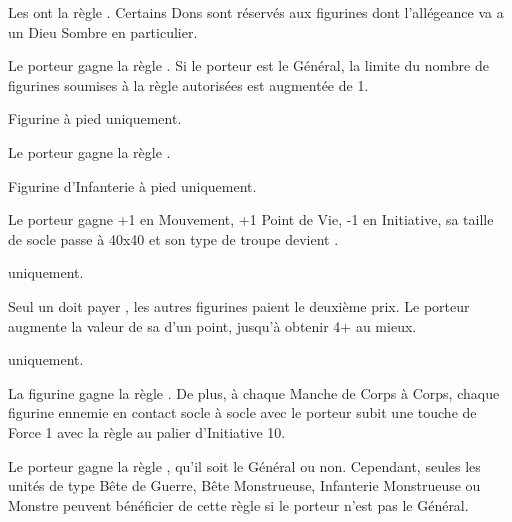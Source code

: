 \enditemlistonecol

\closearmyarmoury












\spaceaftersection{}

Les \giftsofthedarkgods{} ont la règle \oneperarmy{}. Certains Dons sont réservés aux figurines dont l'allégeance va a un Dieu Sombre en particulier.

\begin{multicols}{2}\raggedcolumns

\startpricelistNSP

 Le porteur gagne la règle \terror{}. Si le porteur est le Général, la limite du nombre de figurines soumises à la règle \survivalofthefittest{} autorisées est augmentée de 1.

 Figurine à pied uniquement.

Le porteur gagne la règle .

 Figurine d'Infanterie à pied uniquement.

Le porteur gagne +1 en Mouvement, +1 Point de Vie, -1 en Initiative, sa taille de socle passe à \unit{40x40}{\milli\meter} et son type de troupe devient \monstrousinfantry{}.

\textbf{\dchange} uniquement.

 Seul un \daemonprince{} doit payer , les autres figurines paient le deuxième prix.\newline
Le porteur augmente la valeur de sa \wardsave{} d'un point, jusqu'à obtenir 4+ au mieux.

 \textbf{\pestilence} uniquement.

La figurine gagne la règle \breathweapon{\toxicattacks}. De plus, à chaque Manche de Corps à Corps, chaque figurine ennemie en contact socle à socle avec le porteur subit une touche de Force 1 avec la règle  au palier d'Initiative 10.

\columnbreak
{} Le porteur gagne la règle \inspiringpresence{}, qu'il soit le Général ou non. Cependant, seules les unités de type Bête de Guerre, Bête Monstrueuse, Infanterie Monstrueuse ou Monstre peuvent bénéficier de cette règle si le porteur n'est pas le Général.


\end{multicols}
